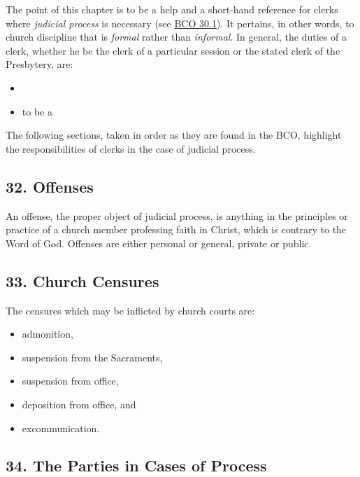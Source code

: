 \documentclass[
]{book}
\providecommand{\tightlist}{%
  \setlength{\itemsep}{0pt}\setlength{\parskip}{0pt}}
\begin{document}
The point of this chapter is to be a help and a short-hand reference for clerks where \emph{judicial process} is necessary (see \href{https://evangel.pressbooks.com/chapter/30-discipline-its-nature-subjects-and-ends/}{BCO 30.1}). It pertains, in other words, to church discipline that is \emph{formal} rather than \emph{informal}. In general, the duties of a clerk, whether he be the clerk of a particular session or the stated clerk of the Presbytery, are:

\begin{itemize}
\tightlist
\item
\item
  to be a
\end{itemize}

The following sections, taken in order as they are found in the BCO, highlight the responsibilities of clerks in the case of judicial process.

\hypertarget{offenses}{%
\subsection{32. Offenses}\label{offenses}}

An offense, the proper object of judicial process, is anything in the principles or practice of a church member professing faith in Christ, which is contrary to the Word of God. Offenses are either personal or general, private or public.

\hypertarget{church-censures}{%
\subsection{33. Church Censures}\label{church-censures}}

The censures which may be inflicted by church courts are:

\begin{itemize}
\tightlist
\item
  admonition,
\item
  suspension from the Sacraments,
\item
  suspension from office,
\item
  deposition from office, and
\item
  excommunication.
\end{itemize}

\hypertarget{the-parties-in-cases-of-process}{%
\subsection{34. The Parties in Cases of Process}\label{the-parties-in-cases-of-process}}
\end{document}
